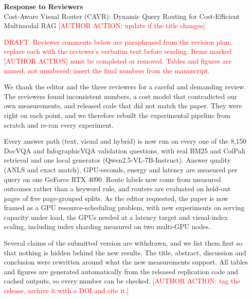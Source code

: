 \documentclass[11pt]{article}
\begin{document}
\begin{center}{\Large\bfseries Response to Reviewers}\\[0.4em]
Cost-Aware Visual Router (CAVR): Dynamic Query Routing for Cost-Efficient Multimodal RAG \textcolor{red}{[AUTHOR ACTION: update if the title changes]}\end{center}
\textcolor{red}{\small DRAFT. Reviewer comments below are paraphrased from the revision plan; replace each with the reviewer's verbatim text before sending. Items marked [AUTHOR ACTION] must be completed or removed. Tables and figures are named, not numbered; insert the final numbers from the manuscript.}

We thank the editor and the three reviewers for a careful and demanding review. The reviewers found inconsistent numbers, a cost model that contradicted our own measurements, and released code that did not match the paper. They were right on each point, and we therefore rebuilt the experimental pipeline from scratch and re-ran every experiment.

Every answer path (text, visual and hybrid) is now run on every one of the 8,150 DocVQA and InfographicVQA validation questions, with real BM25 and ColPali retrieval and one local generator (Qwen2.5-VL-7B-Instruct). Answer quality (ANLS and exact match), GPU-seconds, energy and latency are measured per query on one GeForce RTX 4090. Route labels now come from measured outcomes rather than a keyword rule, and routers are evaluated on held-out pages of five page-grouped splits. As the editor requested, the paper is now framed as a GPU resource-scheduling problem, with new experiments on serving capacity under load, the GPUs needed at a latency target and visual-index scaling, including index sharding measured on two multi-GPU nodes.

Several claims of the submitted version are withdrawn, and we list them first so that nothing is hidden behind the new results. The title, abstract, discussion and conclusion were rewritten around what the new measurements support. All tables and figures are generated automatically from the released replication code and cached outputs, so every number can be checked. \textcolor{red}{[AUTHOR ACTION: tag the release, archive it with a DOI and cite it.]}
\end{document}
